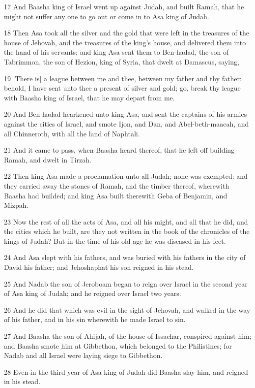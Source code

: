 \par 17 And Baasha king of Israel went up against Judah, and built Ramah, that he might not suffer any one to go out or come in to Asa king of Judah.
\par 18 Then Asa took all the silver and the gold that were left in the treasures of the house of Jehovah, and the treasures of the king's house, and delivered them into the hand of his servants; and king Asa sent them to Ben-hadad, the son of Tabrimmon, the son of Hezion, king of Syria, that dwelt at Damascus, saying,
\par 19 [There is] a league between me and thee, between my father and thy father: behold, I have sent unto thee a present of silver and gold; go, break thy league with Baasha king of Israel, that he may depart from me.
\par 20 And Ben-hadad hearkened unto king Asa, and sent the captains of his armies against the cities of Israel, and smote Ijon, and Dan, and Abel-beth-maacah, and all Chinneroth, with all the land of Naphtali.
\par 21 And it came to pass, when Baasha heard thereof, that he left off building Ramah, and dwelt in Tirzah.
\par 22 Then king Asa made a proclamation unto all Judah; none was exempted: and they carried away the stones of Ramah, and the timber thereof, wherewith Baasha had builded; and king Asa built therewith Geba of Benjamin, and Mizpah.
\par 23 Now the rest of all the acts of Asa, and all his might, and all that he did, and the cities which he built, are they not written in the book of the chronicles of the kings of Judah? But in the time of his old age he was diseased in his feet.
\par 24 And Asa slept with his fathers, and was buried with his fathers in the city of David his father; and Jehoshaphat his son reigned in his stead.
\par 25 And Nadab the son of Jeroboam began to reign over Israel in the second year of Asa king of Judah; and he reigned over Israel two years.
\par 26 And he did that which was evil in the sight of Jehovah, and walked in the way of his father, and in his sin wherewith he made Israel to sin.
\par 27 And Baasha the son of Ahijah, of the house of Issachar, conspired against him; and Baasha smote him at Gibbethon, which belonged to the Philistines; for Nadab and all Israel were laying siege to Gibbethon.
\par 28 Even in the third year of Asa king of Judah did Baasha slay him, and reigned in his stead.
